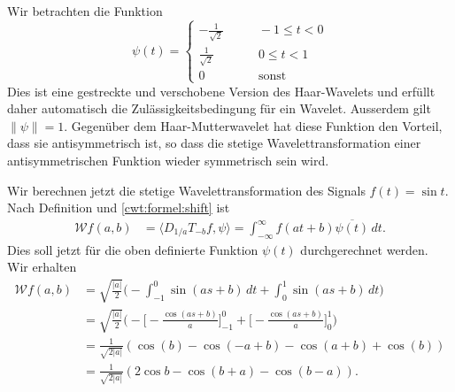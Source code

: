 \begin{beispiel}
Wir betrachten die Funktion
\begin{equation}
\psi(t) = \begin{cases}
-\frac1{\sqrt{2}}&\qquad -1\le t< 0\\
\frac1{\sqrt{2}}&\qquad 0\le t< 1\\
0&\qquad\text{sonst}
\end{cases}
\label{cwt:beispiel:psi}
\end{equation}
Dies ist eine gestreckte und verschobene Version des Haar-Wavelets
und erfüllt daher automatisch die Zulässigkeitsbedingung für ein Wavelet.
Ausserdem gilt $\|\psi\|=1$.
Gegenüber dem Haar-Mutterwavelet hat diese Funktion den Vorteil, dass 
sie antisymmetrisch ist, so dass die stetige Wavelettransformation
einer antisymmetrischen Funktion wieder symmetrisch sein wird.

Wir berechnen jetzt die stetige Wavelettransformation des Signals $f(t)=\sin t$.
Nach Definition und
\eqref{cwt:formel:shift}
ist
\begin{align*}
\mathcal{W}f(a,b)
&=
\langle D_{1/a}T_{-b}f,\psi\rangle
=
\int_{-\infty}^\infty f(at+b) \overline{\psi(t)}\,dt.
\end{align*}
Dies soll jetzt für die oben definierte Funktion $\psi(t)$ durchgerechnet
werden.
Wir erhalten
\begin{align*}
\mathcal{W}f(a,b)
&=
\sqrt{\frac{|a|}{2}}
\biggl(
-
\int_{-1}^0 \sin(as+b)\,dt
+
\int_{0}^1 \sin(as+b)\,dt
\biggr)
\\
&=
\sqrt{\frac{|a|}{2}}
\biggl(
-
\biggl[-\frac{\cos(as+b)}{a}\biggr]_{-1}^0
+
\biggl[-\frac{\cos(as+b)}{a}\biggr]_{0}^1
\biggr)
\\
&=
\frac{1}{\sqrt{2|a|}}
(
\cos(b) - \cos(-a+b) -\cos(a+b)+\cos(b)
)
\\
&=
\frac{1}{\sqrt{2|a|}}
(2\cos b - \cos(b+a) - \cos(b-a)).
\end{align*}


\end{beispiel}
